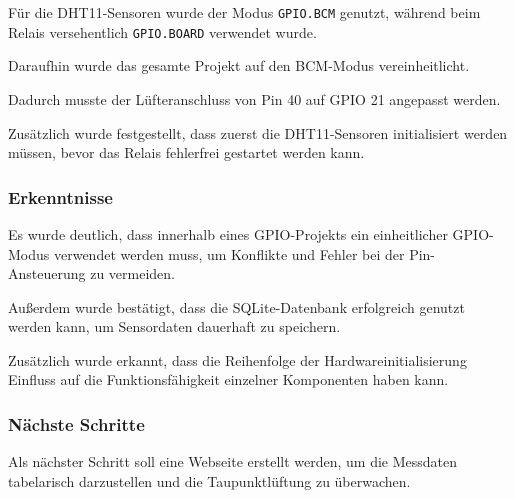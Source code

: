 Für die DHT11-Sensoren wurde der Modus
\texttt{GPIO.BCM} genutzt, während beim
Relais versehentlich \texttt{GPIO.BOARD}
verwendet wurde.

Daraufhin wurde das gesamte Projekt auf den
BCM-Modus vereinheitlicht.

Dadurch musste der Lüfteranschluss von
Pin 40 auf GPIO 21 angepasst werden.

Zusätzlich wurde festgestellt, dass zuerst
die DHT11-Sensoren initialisiert werden
müssen, bevor das Relais fehlerfrei gestartet
werden kann.

\subsubsection{Erkenntnisse}

Es wurde deutlich, dass innerhalb eines
GPIO-Projekts ein einheitlicher GPIO-Modus
verwendet werden muss, um Konflikte und
Fehler bei der Pin-Ansteuerung zu vermeiden.

Außerdem wurde bestätigt, dass die
SQLite-Datenbank erfolgreich genutzt werden
kann, um Sensordaten dauerhaft zu speichern.

Zusätzlich wurde erkannt, dass die Reihenfolge
der Hardwareinitialisierung Einfluss auf die
Funktionsfähigkeit einzelner Komponenten haben
kann.

\subsubsection{Nächste Schritte}

Als nächster Schritt soll eine Webseite
erstellt werden, um die Messdaten tabelarisch
darzustellen und die Taupunktlüftung zu
überwachen.
